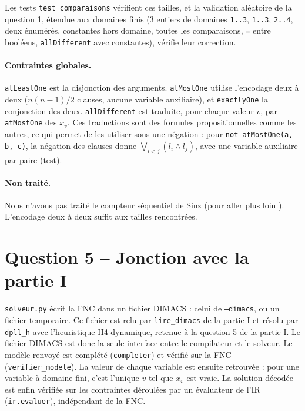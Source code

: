 \documentclass[11pt,a4paper]{article}
\newcommand{\code}[1]{\texttt{#1}}
\begin{document}
Les tests \code{test\_comparaisons} vérifient ces tailles, et la validation aléatoire de la
question 1, étendue aux domaines finis (3 entiers de domaines \code{1..3}, \code{1..3},
\code{2..4}, deux énumérés, constantes hors domaine, toutes les comparaisons, \code{=} entre
booléens, \code{allDifferent} avec constantes), vérifie leur correction.

\paragraph{Contraintes globales.} \code{atLeastOne} est la disjonction des arguments.
\code{atMostOne} utilise l'encodage deux à deux ($n(n-1)/2$ clauses, aucune variable
auxiliaire), et \code{exactlyOne} la conjonction des deux. \code{allDifferent} est traduite,
pour chaque valeur $v$, par \code{atMostOne} des $x_v$. Ces traductions sont des formules
propositionnelles comme les autres, ce qui permet de les utiliser sous une négation : pour
\code{not atMostOne(a, b, c)}, la négation des clauses donne $\bigvee_{i<j} (l_i \wedge l_j)$,
avec une variable auxiliaire par paire (test).

\paragraph{Non traité.} Nous n'avons pas traité le compteur séquentiel de Sinz (\og pour
aller plus loin \fg). L'encodage deux à deux suffit aux tailles rencontrées.

\section{Question 5 -- Jonction avec la partie I}

\code{solveur.py} écrit la FNC dans un fichier DIMACS : celui de \code{--dimacs}, ou un
fichier temporaire. Ce fichier est relu par \code{lire\_dimacs} de la partie I et résolu par
\code{dpll\_h} avec l'heuristique H4 dynamique, retenue à la question 5 de la partie I. Le
fichier DIMACS est donc la seule interface entre le compilateur et le solveur. Le modèle
renvoyé est complété (\code{completer}) et vérifié sur la FNC (\code{verifier\_modele}). La
valeur de chaque variable est ensuite retrouvée : pour une variable à domaine fini, c'est
l'unique $v$ tel que $x_v$ est vraie. La solution décodée est enfin vérifiée sur les
contraintes déroulées par un évaluateur de l'IR (\code{ir.evaluer}), indépendant de la FNC.
\end{document}
